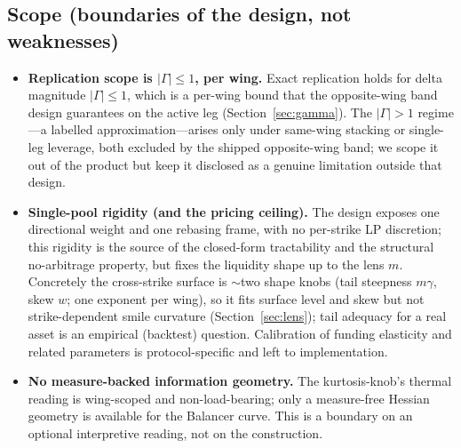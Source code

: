 \documentclass[11pt]{article}
\begin{document}
\subsection{Scope (boundaries of the design, not weaknesses)}
\begin{itemize}[leftmargin=2em]
  \item \textbf{Replication scope is $|\Gamma|\le1$, per wing.} Exact replication
        holds for delta magnitude $|\Gamma|\le1$, which is a per-wing bound that
        the opposite-wing band design guarantees on the active leg
        (Section~\ref{sec:gamma}). The $|\Gamma|>1$ regime---a labelled
        approximation---arises only under same-wing stacking or single-leg
        leverage, both excluded by the shipped opposite-wing band; we scope it out
        of the product but keep it disclosed as a genuine limitation outside that
        design.
  \item \textbf{Single-pool rigidity (and the pricing ceiling).} The design
        exposes one directional weight and one rebasing frame, with no per-strike
        LP discretion; this rigidity is the source of the closed-form tractability
        and the structural no-arbitrage property, but fixes the liquidity shape up
        to the lens $m$. Concretely the cross-strike surface is $\sim$two shape
        knobs (tail steepness $m\gamma$, skew $w$; one exponent per wing), so it
        fits surface level and skew but not strike-dependent smile curvature
        (Section~\ref{sec:lens}); tail adequacy for a real asset is an empirical
        (backtest) question. Calibration of funding elasticity and related
        parameters is protocol-specific and left to implementation.
  \item \textbf{No measure-backed information geometry.} The kurtosis-knob's
        thermal reading is wing-scoped and non-load-bearing; only a measure-free
        Hessian geometry is available for the Balancer curve. This is a boundary on
        an optional interpretive reading, not on the construction.
\end{itemize}
\end{document}
